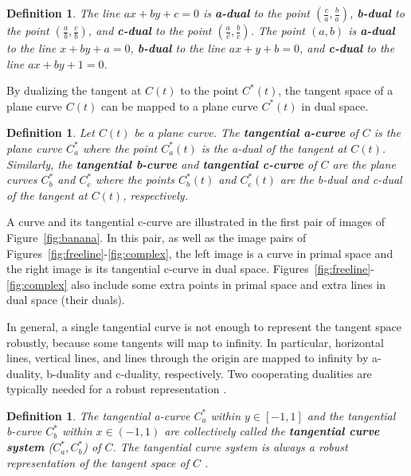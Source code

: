 \documentclass{sig-alternate}
\newtheorem{defn2}[theorem]{Definition}
\begin{document}
\begin{defn2}
The line $ax+by+c=0$ is 
{\bf a-dual} to the point $(\frac{c}{a},\frac{b}{a})$,
{\bf b-dual} to the point $(\frac{a}{b},\frac{c}{b})$, and
{\bf c-dual} to the point $(\frac{a}{c},\frac{b}{c})$.
The point $(a,b)$ is 
{\bf a-dual} to the line $x+by+a=0$,
{\bf b-dual} to the line $ax+y+b=0$, and
{\bf c-dual} to the line $ax+by+1=0$.
\end{defn2}

\noindent By dualizing the tangent at $C(t)$ to the point $C^*(t)$,
the tangent space of a plane curve $C(t)$ can be mapped to a
plane curve $C^*(t)$ in dual space.


\begin{defn2}
Let $C(t)$ be a plane curve.
The {\bf tangential a-curve} of $C$ is the plane curve $C^*_a$ where the point $C^*_a(t)$ 
is the a-dual of the tangent at $C(t)$.  Similarly,
the {\bf tangential b-curve} and {\bf tangential c-curve} of $C$ are the plane curves 
$C^*_b$ and $C^*_c$ where the points $C^*_b(t)$ and $C^*_c(t)$ are
the b-dual and c-dual of the tangent at $C(t)$, respectively.
\end{defn2}

A curve and its tangential c-curve are
illustrated in the first pair of images of Figure~\ref{fig:banana}.
In this pair, as well as the image pairs of Figures~\ref{fig:freeline}-\ref{fig:complex},
the left image is a curve in primal space
and the right image is its tangential c-curve in dual space.
Figures~\ref{fig:freeline}-\ref{fig:complex} 
also include some extra points in primal space
and extra lines in dual space (their duals).

In general, a single tangential curve is not enough to represent the tangent space robustly,
because some tangents will map to infinity.
In particular, horizontal lines, vertical
lines, and lines through the origin are mapped to infinity by a-duality, b-duality
and c-duality, respectively.
Two cooperating dualities are typically needed for a robust representation
\cite{jj01}.

\begin{defn2}
\label{defn:tcsystem}
The tangential a-curve $C^*_a$ within $y \in [-1,1]$ and
the tangential b-curve $C^*_b$ within $x \in (-1,1)$ are collectively 
called the {\bf tangential curve system} 
($C_a^*, C_b^*$) of $C$.
The tangential curve system is always a robust representation of the tangent space of $C$ \cite{jj01,jj02}.
\end{defn2}
\end{document}
